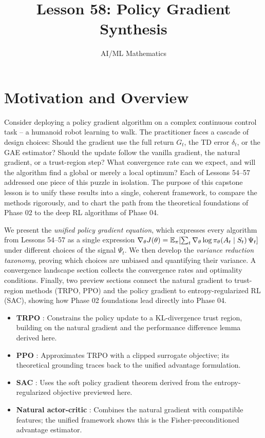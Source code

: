 \documentclass[11pt,a4paper]{article}
\title{Lesson 58: Policy Gradient Synthesis}
\author{AI/ML Mathematics}
\date{}
\begin{document}
\maketitle
\tableofcontents
\newpage

\section{Motivation and Overview}

Consider deploying a policy gradient algorithm on a complex continuous
control task -- a humanoid robot learning to walk. The practitioner
faces a cascade of design choices: Should the gradient use the full
return $G_t$, the TD error $\delta_t$, or the GAE estimator? Should the
update follow the vanilla gradient, the natural gradient, or a
trust-region step? What convergence rate can we expect, and will the
algorithm find a global or merely a local optimum? Each of Lessons 54--57
addressed one piece of this puzzle in isolation. The purpose of this
capstone lesson is to unify these results into a single, coherent
framework, to compare the methods rigorously, and to chart the path
from the theoretical foundations of Phase 02 to the deep RL algorithms
of Phase 04.

We present the \emph{unified policy gradient equation}, which expresses
every algorithm from Lessons 54--57 as a single expression
$\nabla_\theta J(\theta) = \mathbb{E}_\pi[\sum_t \nabla_\theta \log
\pi_\theta(A_t \mid S_t)\, \Psi_t]$ under different choices of the
signal $\Psi_t$. We then develop the \emph{variance reduction taxonomy},
proving which choices are unbiased and quantifying their variance. A
convergence landscape section collects the convergence rates and
optimality conditions. Finally, two preview sections connect the natural
gradient to trust-region methods (TRPO, PPO) and the policy gradient to
entropy-regularized RL (SAC), showing how Phase 02 foundations lead
directly into Phase 04.

\begin{rlconnection}
\begin{itemize}
  \item \textbf{TRPO} \citep{schulman2015trpo}: Constrains the policy
    update to a KL-divergence trust region, building on the natural
    gradient and the performance difference lemma derived here.
  \item \textbf{PPO} \citep{schulman2017}: Approximates TRPO with a
    clipped surrogate objective; its theoretical grounding traces back
    to the unified advantage formulation.
  \item \textbf{SAC} \citep{haarnoja2018}: Uses the soft policy gradient
    theorem derived from the entropy-regularized objective previewed
    here.
  \item \textbf{Natural actor-critic} \citep{peters2008}: Combines the
    natural gradient with compatible features; the unified framework
    shows this is the Fisher-preconditioned advantage estimator.
\end{itemize}
\end{rlconnection}
\end{document}
